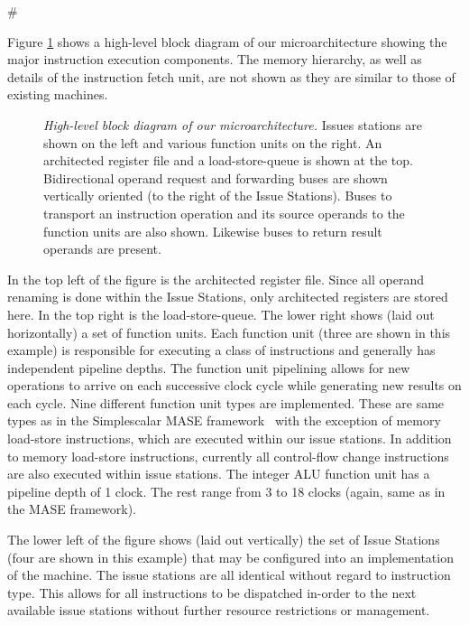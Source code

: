 #\documentclass[10pt,dvips]{article}
\begin{document}
Figure \ref{fig:overview} shows a high-level block diagram
of our microarchitecture showing the major instruction execution components.
The memory hierarchy, as well as details of the instruction fetch
unit, are not shown as they are similar to those of existing
machines.
%
\begin{figure}
\centering
\scriptsize {
}
\caption{{\em High-level block diagram of our microarchitecture.} 
Issues stations are shown on the left and various function
units on the right.  An architected register file and a
load-store-queue is shown at the top.
Bidirectional operand request and forwarding buses are shown
vertically oriented (to the right of the Issue Stations).
Buses to transport an instruction operation and its source operands
to the function units are also shown. 
Likewise buses to return result operands are present.}
\label{fig:overview}
\end{figure}
%
In the top left of the figure is the architected register file.
Since all operand renaming is done within the Issue Stations,
only architected registers are stored here.
In the top right is the load-store-queue.
The lower right shows (laid out horizontally) a set of function units.
Each function unit (three are shown in this example)
is responsible for executing a class of
instructions and generally has independent pipeline depths.
The function unit pipelining allows for new operations to arrive
on each successive clock cycle while generating new results on
each cycle.
Nine different function unit types are implemented.
These are same types as in
the Simplescalar MASE framework~\cite{Austin97} with the
exception of memory load-store instructions, which are executed within our
issue stations.
In addition to memory load-store instructions, currently
all control-flow change instructions are also executed within
issue stations.
The integer ALU function unit has a pipeline depth of 1 clock.
The rest range from 3 to 18 clocks (again, same as in the MASE
framework).

The lower left of the figure shows (laid out vertically) the set of
Issue Stations (four are shown in this example)
that may be configured into an implementation of
the machine.
The issue stations are all identical without regard to 
instruction type.  This allows for all instructions to be
dispatched in-order to the next available issue stations 
without further resource restrictions or management.
\end{document}
